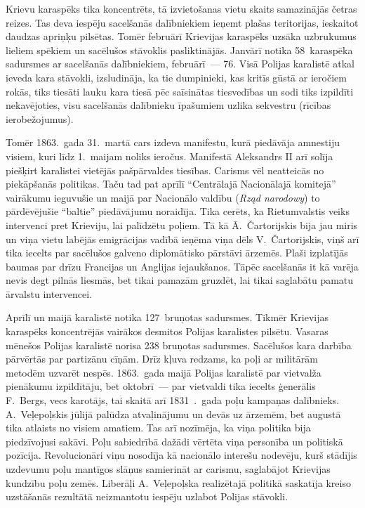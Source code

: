 \documentclass[twoside,a5paper,12pt,fleqn,openany]{extbook}
\newcommand{\pltxti}[1]{\textit{\textpolish{#1}}}
\begin{document}
Krievu karaspēks tika koncentrēts, tā izvietošanas vietu skaits samazinājās četras reizes. Tas deva iespēju sacelšanās dalībniekiem ieņemt plašas teritorijas, ieskaitot daudzas apriņķu pilsētas. Tomēr februārī Krievijas karaspēks uzsāka uzbrukumus lieliem spēkiem un sacēlušos stāvoklis pasliktinājās. Janvārī notika 58~karaspēka sadursmes ar sacelšanās dalībniekiem, februārī~--- 76. Visā Polijas karalistē atkal ieveda kara stāvokli, izsludināja, ka tie dumpinieki, kas kritīs gūstā ar ieročiem rokās, tiks tiesāti lauku kara tiesā pēc saīsinātas tiesvedības un sodi tiks izpildīti nekavējoties, visu sacelšanās dalībnieku īpašumiem uzlika sekvestru (rīcības ierobežojumus).

Tomēr 1863.~gada 31.~martā cars izdeva manifestu, kurā piedāvāja amnestiju visiem, kuri līdz 1.~maijam noliks ieročus. Manifestā Aleksandrs II arī solīja piešķirt karalistei vietējās pašpārvaldes tiesības. Carisms vēl neatteicās no piekāpšanās politikas. Taču tad pat aprīlī ``Centrālajā Nacionālajā komitejā'' vairākumu ieguvušie un maijā par Nacionālo valdību (\pltxti{Rząd narodowy}) to pārdēvējušie ``baltie'' piedāvājumu noraidīja. Tika cerēts, ka Rietumvalstis veiks intervenci pret Krieviju, lai palīdzētu poļiem. Tā kā Ā.~Čartorijskis bija jau miris un viņa vietu labējās emigrācijas vadībā ieņēma viņa dēls V.~Čartorijskis, viņš arī tika iecelts par sacēlušos galveno diplomātisko pārstāvi ārzemēs. Plaši izplatījās baumas par drīzu Francijas un Anglijas iejaukšanos. Tāpēc sacelšanās it kā varēja nevis degt pilnās liesmās, bet tikai pamazām gruzdēt, lai tikai saglabātu pamatu ārvalstu intervencei.

Aprīlī un maijā karalistē notika 127~bruņotas sadursmes. Tikmēr Krievijas karaspēks koncentrējās vairākos desmitos Polijas karalistes pilsētu. Vasaras mēnešos Polijas karalistē norisa 238 bruņotas sadursmes. Sacēlušos kara darbība pārvērtās par partizānu cīņām. Drīz kļuva redzams, ka poļi ar militārām metodēm uzvarēt nespēs. 1863.~gada maijā Polijas karalistē par vietvalža pienākumu izpildītāju, bet oktobrī~--- par vietvaldi tika iecelts ģenerālis F.~Bergs, vecs karotājs, tai skaitā arī 1831~.~gada poļu kampaņas dalībnieks. A.~Veļepoļskis jūlijā palūdza atvaļinājumu un devās uz ārzemēm, bet augustā tika atlaists no visiem amatiem. Tas arī nozīmēja, ka viņa politika bija piedzīvojusi sakāvi. Poļu sabiedrībā dažādi vērtēta viņa personība un politiskā pozīcija. Revolucionāri viņu nosodīja kā nacionālo interešu nodevēju, kurš stādījis uzdevumu poļu mantīgos slāņus samierināt ar carismu, saglabājot Krievijas kundzību poļu zemēs. Liberāļi A.~Veļepoļska realizētajā politikā saskatīja kreiso uzstāšanās rezultātā neizmantotu iespēju uzlabot Polijas stāvokli.
\end{document}
